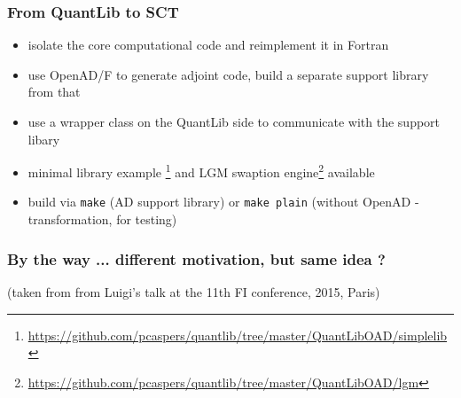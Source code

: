 \documentclass[10pt,German]{beamer}
\begin{document}
\begin{frame}[fragile]
\frametitle{From QuantLib to SCT}
\begin{itemize}
\item isolate the core computational code and reimplement it in Fortran
\item use OpenAD/F to generate adjoint code, build a separate support library from that
\item use a wrapper class on the QuantLib side to communicate with the support libary
\item minimal library example \footnote{\tiny\url{https://github.com/pcaspers/quantlib/tree/master/QuantLibOAD/simplelib}} and LGM swaption engine\footnote{\tiny\url{https://github.com/pcaspers/quantlib/tree/master/QuantLibOAD/lgm}} available
\item build via \verb+make+ (AD support library) or \verb+make plain+ (without OpenAD - transformation, for testing)
\end{itemize}
\end{frame}

\begin{frame}[fragile]
\frametitle{By the way ... different motivation, but same idea ?}
(taken from from Luigi's talk at the 11th FI conference, 2015, Paris)
\end{frame}
\end{document}

